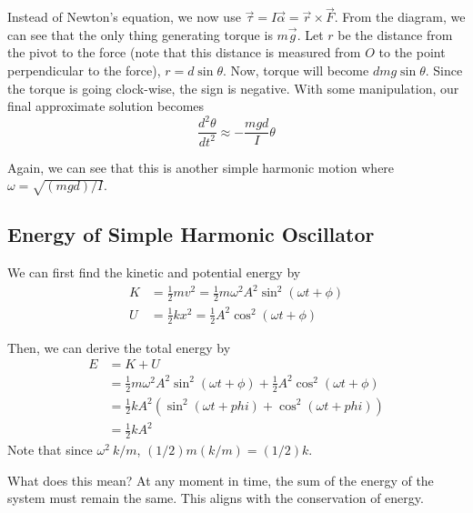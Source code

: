 Instead of Newton's equation, we now use $\vec{\tau} = I\vec{\alpha} = \vec{r}\times\vec{F}$.
From the diagram, we can see that the only thing generating torque is $m\vec{g}$. Let $r$ be the
distance from the pivot to the force (note that this distance is measured from $O$ to the point
perpendicular to the force), $r = d\sin\theta$. Now, torque will become $dmg\sin\theta$. Since
the torque is going clock-wise, the sign is negative. With some manipulation, our final 
approximate solution becomes
\[ \frac{d^2\theta}{dt^2} \approx -\frac{mgd}{I}\theta \]

Again, we can see that this is another simple harmonic motion where $\omega = \sqrt{(mgd)/I}$.

\subsection{Energy of Simple Harmonic Oscillator}

We can first find the kinetic and potential energy by
\begin{align*}
    K &= \frac{1}{2}mv^2 = \frac{1}{2}m\omega^2A^2\sin^2(\omega t + \phi)\\
    U &= \frac{1}{2}kx^2 = \frac{1}{2}A^2\cos^2(\omega t + \phi)
\end{align*}

Then, we can derive the total energy by
\begin{align*}
    E &= K + U\\
    &= \frac{1}{2}m\omega^2A^2\sin^2(\omega t + \phi) + \frac{1}{2}A^2\cos^2(\omega t + \phi)\\
    &= \frac{1}{2}kA^2 ( \sin^2(\omega t + phi) + \cos^2(\omega t + phi))\\
    &= \frac{1}{2}kA^2
\end{align*}
Note that since $\omega^2 \ k / m$, $(1/2)m(k/m) = (1/2)k$.

What does this mean? At any moment in time, the sum of the energy of the system must remain the same.
This aligns with the conservation of energy.